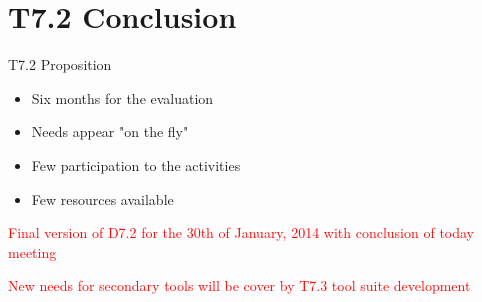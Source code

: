 
\section{T7.2 Conclusion}


\begin{frame}{T7.2 Proposition}



\begin{itemize}
\item Six months for the evaluation 
\item Needs appear "on the fly" 
\item Few participation to the activities
\item Few resources available
\end{itemize}

  \pause
  \textcolor{red}{Final version of D7.2 for the 30th of January, 2014 with conclusion of today meeting}
  
  
  \pause
  \textcolor{red}{New needs for secondary tools will be cover by T7.3 tool suite development}

\end{frame}

